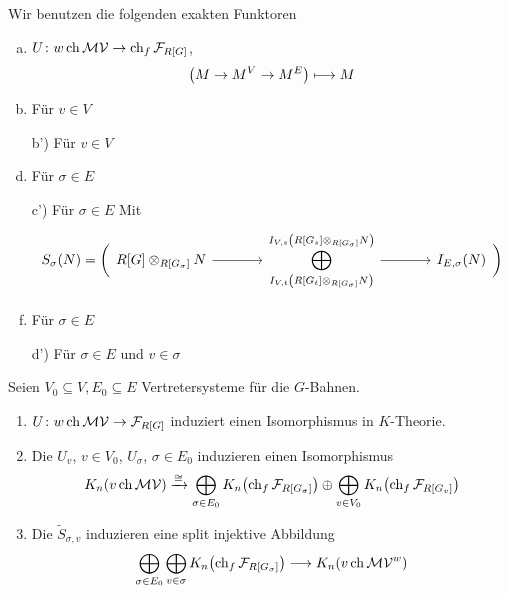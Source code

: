 \begin{bemerkung}
	Wir benutzen die folgenden exakten Funktoren
	\begin{enumerate}[a)]
		\item $U \colon w \ch \mathcal{MV} \to \ch_f \mathcal{F}_{R[G]}$, 
		\[
			\enbrace*{M \to M^V \to M^E} \longmapsto M
		\]
		\item Für $v \in V$
		\item[b')] Für $v \in V$
		\item Für $\sigma \in E$
		\item[c')] Für $\sigma \in E$
		Mit 
		\[
			S_\sigma(N) = 
			\bigg(\begin{tikzcd}[sep=large]
				R[G] \otimes_{R[G_\sigma]} N \rar & \displaystyle\bigoplus_{I_{V,t} \enbrace*{R[G_t] \otimes_{R[G_\sigma]} N}}^{I_{V,s} \enbrace*{R[G_s] \otimes_{R[G_\sigma]} N}} \rar & I_{E,\sigma}(N)
			\end{tikzcd} \bigg)
		\]
		\item Für $\sigma \in E$
		\item[d')] Für $\sigma \in E$ und $v \in \sigma$
	\end{enumerate}
\end{bemerkung}

\begin{proposition}
	Seien $V_0 \subseteq V, E_0 \subseteq E$ Vertretersysteme für die $G$-Bahnen.
	\begin{enumerate}[(1)]
		\item $U \colon w \ch \mathcal{MV} \to \mathcal{F}_{R[G]}$ induziert einen Isomorphismus in $K$-Theorie.
		\item Die $U_v$, $v \in V_0$, $U_\sigma$, $\sigma \in E_0$ induzieren einen Isomorphismus
		\[
			K_n \enbrace*{v \ch \mathcal{MV}} \xrightarrow{\cong} \bigoplus_{\sigma \in  E_0} K_n \enbrace*{\ch_f \mathcal{F}_{R[G_\sigma]}} \oplus  \bigoplus_{v \in V_0} K_n \enbrace*{\ch_f \mathcal{F}_{R[G_v]}}
		\]
		\item Die $\tilde{S}_{\sigma,v}$ induzieren eine split injektive Abbildung
		\[
			\bigoplus_{\sigma \in E_0} \bigoplus_{v \in \sigma} K_n \enbrace*{\ch_f \mathcal{F}_{R[G_\sigma]}} \longrightarrow K_n \enbrace*{v \ch \mathcal{MV}^w}
		\]
	\end{enumerate}
\end{proposition}

